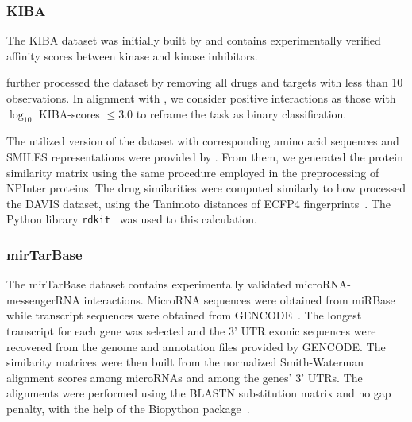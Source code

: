 \subsubsection{KIBA}

The KIBA dataset was initially built by  and contains experimentally verified affinity scores between kinase and kinase inhibitors.

 further processed the dataset by removing all drugs and targets with less than 10 observations. In alignment with , we consider positive interactions as those with $\log_{10}$ KIBA-scores $\leq 3.0$ to reframe the task as binary classification.

The utilized version of the dataset with corresponding amino acid sequences and SMILES representations were provided by . From them, we generated the protein similarity matrix using the same procedure employed in the preprocessing of NPInter proteins. The drug similarities were computed similarly to how  processed the DAVIS dataset, using the Tanimoto distances of ECFP4 fingerprints~\cite{rogers2005using,pahikkala2015more}. The Python library \texttt{rdkit}~\cite{landrum2023rdkit} was used to this calculation.


\subsubsection{mirTarBase}

The mirTarBase dataset contains experimentally validated microRNA-messengerRNA interactions. MicroRNA sequences were obtained from miRBase~\cite{griffiths-jones2006mirbase} while transcript sequences were obtained from GENCODE~\cite{frankish2021gencode}. The longest transcript for each gene was selected and the 3' UTR exonic sequences were recovered from the genome and annotation files provided by GENCODE. The similarity matrices were then built from the normalized Smith-Waterman~\cite{yamanishi2008prediction} alignment scores among microRNAs and among the genes' 3' UTRs. The alignments were performed using the BLASTN substitution matrix and no gap penalty, with the help of the Biopython package~\cite{cock2009biopython}.

